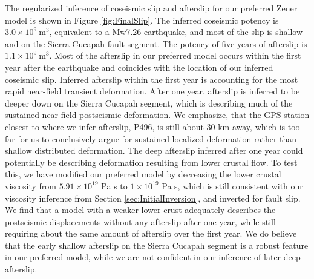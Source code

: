 \documentclass[draft,linenumbers]{AGUJournal}
\begin{document}
The regularized inference of coseismic slip and afterslip for our preferred Zener model is shown in Figure \ref{fig:FinalSlip}.  The inferred coseismic potency is $3.0\times10^{9}\ \mathrm{m}^3$, equivalent to a Mw7.26 earthquake, and most of the slip is shallow and on the Sierra Cucapah fault segment.  The potency of five years of afterslip is $1.1\times10^{9}\ \mathrm{m}^3$. Most of the afterslip in our preferred model occurs within the first year after the earthquake and coincides with the location of our inferred coseismic slip. Inferred afterslip within the first year is accounting for the most rapid near-field transient deformation. After one year, afterslip is inferred to be deeper down on the Sierra Cucapah segment, which is describing much of the sustained near-field postseismic deformation.  We emphasize, that the GPS station closest to where we infer afterslip, P496, is still about 30 km away, which is too far for us to conclusively argue for sustained localized deformation rather than shallow distributed deformation.  The deep afterslip inferred after one year could potentially be describing deformation resulting from lower crustal flow. To test this, we have modified our preferred model by decreasing the lower crustal viscosity from $5.91\times10^{19}$ Pa s to $1\times10^{19}$ Pa s, which is still consistent with our viscosity inference from Section \ref{sec:InitialInversion}, and inverted for fault slip.  We find that a model with a weaker lower crust adequately describes the postseismic displacements without any afterslip after one year, while still requiring about the same amount of afterslip over the first year. We do believe that the early shallow afterslip on the Sierra Cucapah segment is a robust feature in our preferred model, while we are not confident in our inference of later deep afterslip.                   
\end{document}
